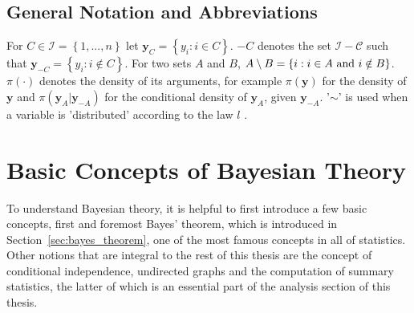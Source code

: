\subsection{General Notation and Abbreviations}
For $C\in\mathcal{I}=\left\lbrace1,...,n\right\rbrace$ let $\pmb{y}_C=\left\lbrace y_i:i\in C\right\rbrace$. $-C$ denotes the set $\mathcal{I-C}$ such that $\pmb{y}_{-C}=\left\lbrace y_i:i\notin C\right\rbrace$. For two sets $A$ and $B$, $A\setminus B=\left\lbrace i:i\in A \hbox{ and } i \notin B\right\rbrace$. \\
$\pi\left(\cdot\right)$ denotes the density of its arguments, for example $\pi\left(\pmb{y}\right)$ for the density of $\pmb{y}$ and $\pi\left(\pmb{y}_A|\pmb{y}_{-A}\right)$ for the conditional density of $\pmb{y}_A$, given $\pmb{y}_{-A}$. '$\sim$' is used when a variable is 'distributed' according to the law $l$ \autocite[][16]{rue2005gaussian}.
\clearpage
\section{Basic Concepts of Bayesian Theory}
To understand Bayesian theory, it is helpful to first introduce a few basic concepts, first and foremost Bayes' theorem, which is introduced in Section~\ref{sec:bayes_theorem}, one of the most famous concepts in all of statistics. Other notions that are integral to the rest of this thesis are the concept of conditional independence, undirected graphs and the computation of summary statistics, the latter of which is an essential part of the analysis section of this thesis.
